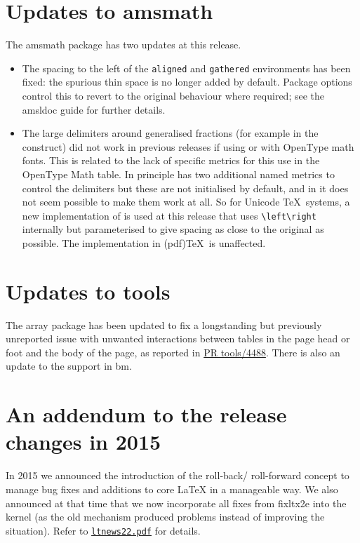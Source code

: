 \documentclass{ltnews}
\begin{document}
\section{Updates to \textsf{amsmath}}
The \textsf{amsmath} package has two updates at this release.
\begin{itemize}
\item The spacing to the left of the \texttt{aligned} and
  \texttt{gathered} environments has been fixed: the spurious thin
  space is no longer added by default. Package options control this
  to revert to the original behaviour where required; see the
  \textsf{amsldoc} guide for further details. 
\item The large delimiters around generalised fractions (for example
  in the  construct) did not work in previous releases if
  using  or  with OpenType math fonts. This is
  related to the lack of specific metrics for this use in the OpenType Math
  table. In principle  has two additional named metrics
  to control the delimiters but these are not initialised by default,
  and in  it does not seem possible to make them work at all.
  So for Unicode \TeX\ systems, a new implementation of
   is used at this release that uses \verb|\left\right|
  internally but parameterised to give spacing as close to the
  original as possible. The implementation in (pdf)\TeX\ is
  unaffected.
\end{itemize}

\section{Updates to \textsf{tools}}
The \textsf{array} package has been updated to fix a longstanding but
previously unreported issue with unwanted interactions between tables
in the page head or foot and the body of the page, as reported in
\href{http://www.latex-project.org/cgi-bin/ltxbugs2html?pr=tools/4488}{PR
  tools/4488}.
There is also an update to the  support in \textsf{bm}.

\section{An addendum to the release changes in 2015}

In 2015 we announced the introduction of the roll-back\slash
roll-forward concept to manage bug fixes and additions to core
\LaTeX{} in a manageable way. We also announced at that time
that we now incorporate all fixes from \textsf{fixltx2e} into the
kernel (as the old mechanism produced problems instead of improving
the situation). Refer to
\href{https://www.latex-project.org/news/latex2e-news/ltnews22.pdf}{\texttt{ltnews22.pdf}}
for details.
\end{document}
